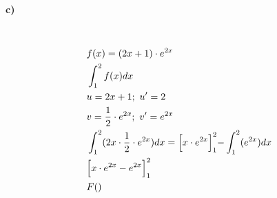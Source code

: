 \documentclass[12pt,a4paper]{report}
\begin{document}
	\paragraph{c)} \mbox{} \\
	\begin{align*}
		&f(x) = (2x + 1) \cdot e^{2x} \\
		&\int_{1}^{2} f(x)dx \\
		&u = 2x + 1;\ u' = 2 \\
		&v = \frac{1}{2}\cdot e^{2x};\ v' = e^{2x} \\
		&\int_{1}^{2} (2x \cdot \frac{1}{2} \cdot e^{2x}) dx = \Bigl[x \cdot e^{2x}\Bigl]^{2}_{1} - \int_{1}^{2} (e^{2x}) dx \\
		&\Bigl[x \cdot e^{2x} - e^{2x}\Bigl]^{2}_1 \\
		&F()
	\end{align*}
\end{document}
